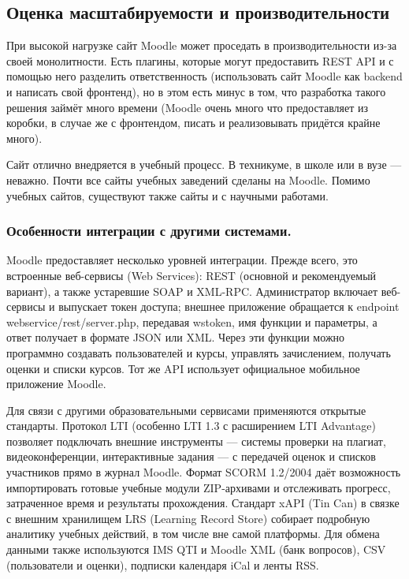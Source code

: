 \documentclass[a4paper, 14pt]{extarticle}
\begin{document}
\subsection{Оценка масштабируемости и производительности}
При высокой нагрузке сайт Moodle может проседать в
производительности из-за своей монолитности. Есть плагины, которые
могут предоставить REST API и с помощью него разделить ответственность
(использовать сайт Moodle как backend и написать свой фронтенд), но в
этом есть минус в том, что разработка такого решения займёт много
времени (Moodle очень много что предоставляет из коробки, в случае же
с фронтендом, писать и реализовывать придётся крайне много). \par
Сайт отлично внедряется в учебный процесс. В техникуме, в школе или в
вузе --- неважно. Почти все сайты учебных заведений сделаны на Moodle.
Помимо учебных сайтов, существуют также сайты и с научными работами.

\subsubsection{Особенности интеграции с другими системами.}
Moodle предоставляет несколько уровней интеграции. Прежде всего, это
встроенные веб-сервисы (Web Services): REST (основной и рекомендуемый
вариант), а также устаревшие SOAP и XML-RPC. Администратор включает
веб-сервисы и выпускает токен доступа; внешнее приложение обращается
к endpoint webservice/\allowbreak rest/\allowbreak server.php,
передавая wstoken, имя функции
и параметры, а ответ получает в формате JSON или XML. Через эти
функции можно программно создавать пользователей и курсы, управлять
зачислением, получать оценки и списки курсов. Тот же API использует
официальное мобильное приложение Moodle.

Для связи с другими образовательными сервисами применяются открытые
стандарты. Протокол LTI (особенно LTI 1.3 с расширением LTI
Advantage) позволяет подключать внешние инструменты — системы
проверки на плагиат, видеоконференции, интерактивные задания — с
передачей оценок и списков участников прямо в журнал Moodle. Формат
SCORM 1.2/2004 даёт возможность импортировать готовые учебные модули
ZIP-архивами и отслеживать прогресс, затраченное время и результаты
прохождения. Стандарт xAPI (Tin Can) в связке с внешним хранилищем
LRS (Learning Record Store) собирает подробную аналитику учебных
действий, в том числе вне самой платформы. Для обмена данными также
используются IMS QTI и Moodle XML (банк вопросов), CSV (пользователи
и оценки), подписки календаря iCal и ленты RSS.
\end{document}
